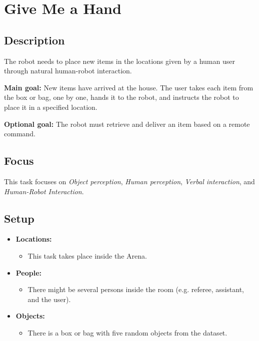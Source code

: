\section{Give Me a Hand}
\label{test:hri-task}

\subsection*{Description}
The robot needs to place new items in the locations given by a human user through natural human-robot interaction.

\textbf{Main goal:}
New items have arrived at the house. The user takes each item from the box or bag, one by one, hands it to the robot, and instructs the robot to place it in a specified location.

\textbf{Optional goal:}
The robot must retrieve and deliver an item based on a remote command. 

\subsection*{Focus}
This task focuses on
\textit{Object perception},
\textit{Human perception},
\textit{Verbal interaction}, and
\textit{Human-Robot Interaction}.

\subsection*{Setup}
\begin{itemize}[nosep]	
	\item \textbf{Locations:} 
	\begin{itemize}
		\item This task takes place inside the Arena.
	\end{itemize}	 
	\item \textbf{People:} 
	\begin{itemize}
		\item There might be several persons inside the room (e.g. referee, assistant, and the user).
	\end{itemize}
	\item \textbf{Objects:}
		\begin{itemize}
			\item There is a box or bag with five random objects from the dataset.
		\end{itemize}
\end{itemize}

